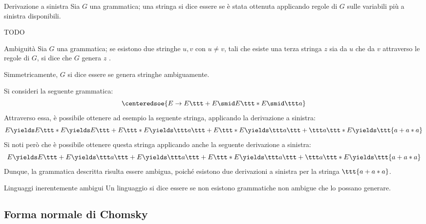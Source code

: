 \documentclass[a4paper, 12pt]{report}
\begin{document}
    \begin{frameddefn}{Derivazione a sinistra}
        Sia $G$ una grammatica; una stringa si dice essere  se è stata ottenuta applicando regole di $G$ sulle variabili più a sinistra disponibili.
    \end{frameddefn}

    \begin{example}
        TODO
    \end{example}

    \begin{frameddefn}{Ambiguità}
        Sia $G$ una grammatica; se esistono due stringhe $u, v$ con $u \neq v$, tali che esiste una terza stringa $z$  sia da $u$ che da $v$ attraverso le regole di $G$, si dice che $G$ genera $z$ .

        Simmetricamente, $G$ si dice essere  se genera stringhe ambiguamente.
    \end{frameddefn}

    \begin{example}
        Si consideri la seguente grammatica: $$\centeredsoe{E \to E \ttt + E \smid E \ttt * E \smid \ttt a}$$ Attraverso essa, è possibile ottenere ad esempio la seguente stringa, applicando la derivazione a sinistra: $$E \yields E \ttt * E \yields E \ttt + E \ttt * E \yields \ttt a \ttt + E \ttt * E \yields \ttt a \ttt + \ttt a \ttt * E \yields \ttt{a+a*a}$$ Si noti però che è possibile ottenere questa stringa applicando anche la seguente derivazione a sinistra: $$E \yields E \ttt + E \yields \ttt a \ttt + E \yields \ttt a \ttt + E \ttt * E \yields \ttt a \ttt + \ttt a \ttt * E \yields \ttt{a+a*a}$$ Dunque, la grammatica descritta risulta essere ambigua, poiché esistono due derivazioni a sinistra per la stringa $\ttt{a+a*a}$.
    \end{example}

    \begin{frameddefn}{Linguaggi inerentemente ambigui}
        Un linguaggio si dice essere  se non esistono grammatiche non ambigue che lo possano generare.
    \end{frameddefn}

    \subsection{Forma normale di Chomsky}
\end{document}
